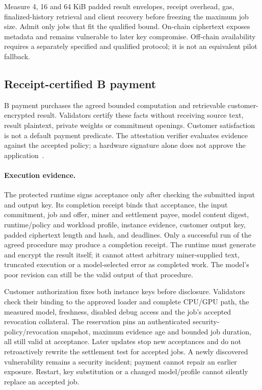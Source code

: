 Measure 4, 16 and 64 KiB padded result envelopes, receipt overhead, gas,
finalized-history retrieval and client recovery before freezing the
maximum job size. Admit only jobs that fit the qualified bound.
On-chain ciphertext exposes metadata and remains vulnerable to later
key compromise. Off-chain availability requires a separately specified
and qualified protocol; it is not an equivalent pilot fallback.

\subsection{Receipt-certified B payment}\label{payment-without-disclosing-the-job}
\label{receipt-certified-payment}

B payment purchases the agreed bounded computation and retrievable
customer-encrypted result. Validators certify these facts without
receiving source text, result plaintext, private weights or commitment
openings. Customer satisfaction is not a default payment predicate.
The attestation verifier evaluates evidence against the accepted policy;
a hardware signature alone does not approve the application~\cite{rats}.

\paragraph{Execution evidence.}
The protected runtime signs acceptance only after checking the submitted
input and output key. Its completion receipt binds that acceptance,
the input commitment, job and offer, miner and settlement payee, model
content digest, runtime/policy and workload profile, instance evidence,
customer output key, padded ciphertext length and hash, and deadlines.
Only a successful run of the agreed procedure may produce a completion
receipt. The runtime must generate and encrypt the result itself; it
cannot attest arbitrary miner-supplied text, truncated execution or a
model-selected error as completed work. The model's poor revision can
still be the valid output of that procedure.

Customer authorization fixes both instance keys before disclosure.
Validators check their binding to the approved loader and complete
CPU/GPU path, the measured model, freshness, disabled debug access and
the job's accepted revocation collateral. The reservation pins an
authenticated security-policy/revocation snapshot, maximum evidence age
and bounded job duration, all still valid at acceptance. Later updates
stop new acceptances and do not retroactively rewrite the settlement
test for accepted jobs. A newly discovered vulnerability remains a
security incident; payment cannot repair an earlier exposure. Restart,
key substitution or a changed model/profile cannot silently replace an
accepted job.


